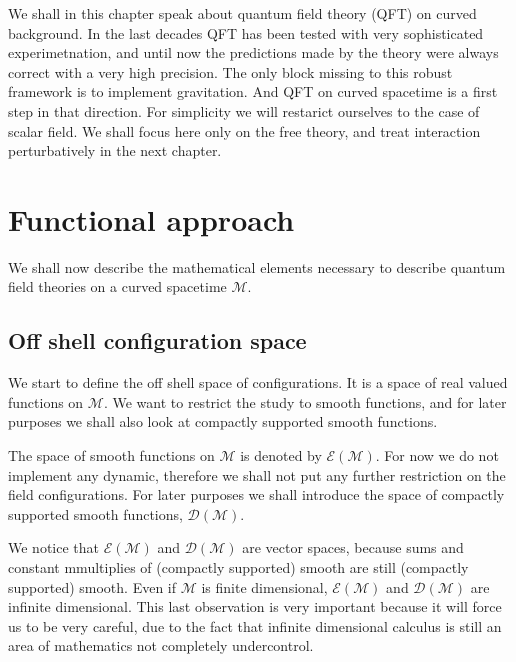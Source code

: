 \documentclass[10pt]{book}
\newcommand{\Dcal}{\mathcal{D}}
\newcommand{\Ecal}{\mathcal{E}}
\newcommand{\Mcal}{\mathcal{M}}
\theoremstyle{break}
\begin{document}
We shall in this chapter speak about quantum field theory (QFT) on curved background. In the last decades QFT has been tested with very sophisticated experimetnation, and until now the predictions made by the theory were always correct with a very high precision. The only block missing to this robust framework is to implement gravitation. And QFT on curved spacetime is a first step in that direction. For simplicity we will restarict ourselves to the case of scalar field. We shall focus here only on the free theory, and treat interaction perturbatively in the next chapter.\par%


\section{Functional approach}


We shall now describe the mathematical elements necessary to describe quantum field theories on a curved spacetime $\Mcal$.\par%


\subsection{Off shell configuration space}


We start to define the off shell space of configurations. It is a space of real valued functions on $\Mcal$. We want to restrict the study to smooth functions, and for later purposes we shall also look at compactly supported smooth functions.\par%


\bigskip


The space of smooth functions on $\Mcal$ is denoted by $\Ecal(\Mcal)$. For now we do not implement any dynamic, therefore we shall not put any further restriction on the field configurations. For later purposes we shall introduce the space of compactly supported smooth functions, $\Dcal(\Mcal)$.


\bigskip


We notice that $\Ecal(\Mcal)$ and $\Dcal(\Mcal)$ are vector spaces, because sums and constant mmultiplies of (compactly supported) smooth are still (compactly supported) smooth. Even if $\Mcal$ is finite dimensional, $\Ecal(\Mcal)$ and $\Dcal(\Mcal)$ are infinite dimensional. This last observation is very important because it will force us to be very careful, due to the fact that infinite dimensional calculus is still an area of mathematics not completely undercontrol.
\end{document}

